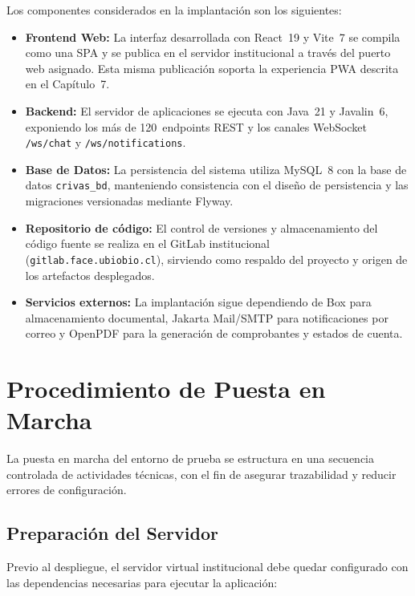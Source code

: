 Los componentes considerados en la implantación son los siguientes:

\begin{itemize}
    \item \textbf{Frontend Web:} La interfaz desarrollada con React~19 y Vite~7 se compila como una SPA y se publica en el servidor institucional a través del puerto web asignado. Esta misma publicación soporta la experiencia PWA descrita en el Capítulo~7.

    \item \textbf{Backend:} El servidor de aplicaciones se ejecuta con Java~21 y Javalin~6, exponiendo los más de 120~endpoints REST y los canales WebSocket \texttt{/ws/chat} y \texttt{/ws/notifications}.

    \item \textbf{Base de Datos:} La persistencia del sistema utiliza MySQL~8 con la base de datos \texttt{crivas\_bd}, manteniendo consistencia con el diseño de persistencia y las migraciones versionadas mediante Flyway.

    \item \textbf{Repositorio de código:} El control de versiones y almacenamiento del código fuente se realiza en el GitLab institucional (\texttt{gitlab.face.ubiobio.cl}), sirviendo como respaldo del proyecto y origen de los artefactos desplegados.

    \item \textbf{Servicios externos:} La implantación sigue dependiendo de Box para almacenamiento documental, Jakarta Mail/SMTP para notificaciones por correo y OpenPDF para la generación de comprobantes y estados de cuenta.
\end{itemize}

\section{Procedimiento de Puesta en Marcha}

La puesta en marcha del entorno de prueba se estructura en una secuencia controlada de actividades técnicas, con el fin de asegurar trazabilidad y reducir errores de configuración.

\subsection{Preparación del Servidor}

Previo al despliegue, el servidor virtual institucional debe quedar configurado con las dependencias necesarias para ejecutar la aplicación:

